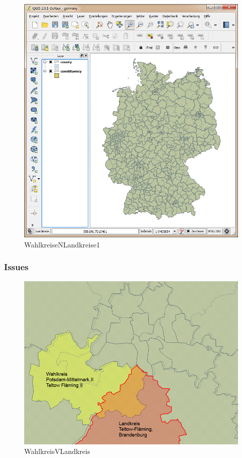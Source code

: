 \begin{figure}[htbp]
\centering
\includegraphics[width=1.1\textwidth]{../img/K4GjcyV.png}
\caption{WahlkreiseNLandkreise1}
\end{figure}

\subsubsection{Issues}\label{issues}

\begin{figure}[htbp]
\centering
\includegraphics[width=1.1\textwidth]{../img/HdnNLcV.png}
\caption{WahlkreisVLandkreis}
\end{figure}

